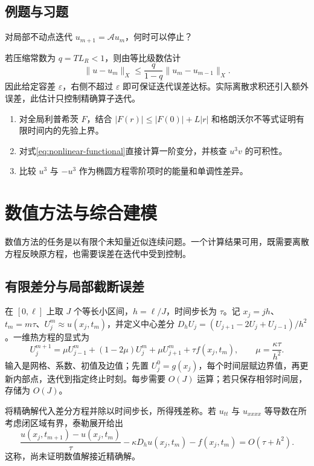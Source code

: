\documentclass[UTF8,12pt,a4paper,fontset=fandol]{ctexbook}
\begin{document}
\section{例题与习题}
\begin{example}
对局部不动点迭代 $u_{m+1}=\mathcal Au_m$，何时可以停止？
\end{example}
\begin{solve}
若压缩常数为 $q=TL_R<1$，则由等比级数估计
\[
 \|u-u_m\|_X\le\frac{q}{1-q}\|u_m-u_{m-1}\|_X.
\]
因此给定容差 $\varepsilon$，右侧不超过 $\varepsilon$ 即可保证迭代误差达标。实际离散求积还引入额外误差，此估计只控制精确算子迭代。
\end{solve}
\begin{enumerate}
 \item 对全局利普希茨 $F$，结合 $|F(r)|\le|F(0)|+L|r|$ 和格朗沃尔不等式证明有限时间内的先验上界。
 \item 对式\eqref{eq:nonlinear-functional}直接计算一阶变分，并核查 $u^3v$ 的可积性。
 \item 比较 $u^3$ 与 $-u^3$ 作为椭圆方程零阶项时的能量和单调性差异。
\end{enumerate}

\chapter{数值方法与综合建模}
\label{chap:numerics}

数值方法的任务是以有限个未知量近似连续问题。一个计算结果可用，既需要离散方程反映原方程，也需要误差在迭代中受到控制。

\section{有限差分与局部截断误差}
在 $[0,\ell]$ 上取 $J$ 个等长小区间，$h=\ell/J$，时间步长为 $\tau$。记 $x_j=jh$、$t_m=m\tau$、$U_j^m\approx u(x_j,t_m)$，并定义中心差分 $D_hU_j=(U_{j+1}-2U_j+U_{j-1})/h^2$。一维热方程的显式为
\begin{equation}
 U_j^{m+1}=\mu U_{j-1}^m+(1-2\mu)U_j^m+\mu U_{j+1}^m+\tau f(x_j,t_m),
 \qquad \mu=\frac{\kappa\tau}{h^2}.
 \label{eq:heat-explicit-scheme}
\end{equation}
输入是网格、系数、初值及边值；先置 $U_j^0=g(x_j)$，每个时间层赋边界值，再更新内部点，迭代到指定终止时刻。每步需要 $O(J)$ 运算；若只保存相邻时间层，存储为 $O(J)$。

将精确解代入差分方程并除以时间步长，所得残差称。若 $u_{tt}$ 与 $u_{xxxx}$ 等导数在所考虑闭区域有界，泰勒展开给出
\[
 \frac{u(x_j,t_{m+1})-u(x_j,t_m)}\tau-\kappa D_hu(x_j,t_m)-f(x_j,t_m)
 =O(\tau+h^2).
\]
这称，尚未证明数值解接近精确解。
\end{document}
